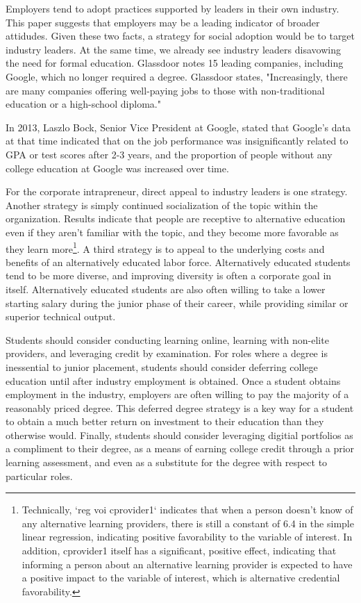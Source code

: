 \documentclass[AER]{./aea-latex-templates/AEA}
\begin{document}
Employers tend to adopt practices supported by leaders in their own industry.
This paper suggests that employers may be a leading indicator of broader attidudes.
Given these two facts, a strategy for social adoption would be to target industry leaders.
At the same time, we already see industry leaders disavowing the need for formal education.
Glassdoor notes 15 leading companies, including Google, which no longer required a degree\cite{glassdoor_2018}. Glassdoor
states, "Increasingly, there are many companies offering well-paying jobs
to those with non-traditional education or a high-school diploma."

In 2013, Laszlo Bock, Senior Vice President at Google, stated that Google’s data at that time indicated
that on the job performance was insignificantly related to GPA or test
scores after 2-3 years, and the proportion of people without any college
education at Google was increased over time\cite{bryant_2013}.

For the corporate intrapreneur, direct appeal to industry leaders is one strategy.
Another strategy is simply continued socialization of the topic within the organization.
Results indicate that people are receptive to alternative education even if they aren’t
familiar with the topic, and they become more favorable as they learn
more\footnote{Technically, `reg voi cprovider1` indicates that when a person doesn’t know of any alternative learning providers, there is still a constant of 6.4 in the simple linear regression, indicating positive favorability to the variable of interest. In addition, cprovider1 itself has a significant, positive effect, indicating that informing a person about an alternative learning provider is expected to have a positive impact to the variable of interest, which is alternative credential favorability.}.
A third strategy is to appeal to the underlying costs and benefits of an alternatively educated labor force.
Alternatively educated students tend to be more diverse\cite{florentine_2018}, and improving diversity is often a corporate goal in itself.
Alternatively educated students are also often willing to take a lower starting salary during the junior phase of their career, while providing similar or superior technical output.

Students should consider conducting learning online, learning with non-elite providers,
and leveraging credit by examination.
For roles where a degree is inessential to junior placement, students should consider
deferring college education until after industry employment is obtained.
Once a student obtains employment in the industry, employers are often willing to pay the majority of a reasonably priced degree.
This deferred degree strategy is a key way for a student to obtain a much better return on investment to their education than they otherwise would.
Finally, students should consider leveraging digitial portfolios as a compliment to their degree,
as a means of earning college credit through a prior learning assessment,
and even as a substitute for the degree with respect to particular roles.
\end{document}
